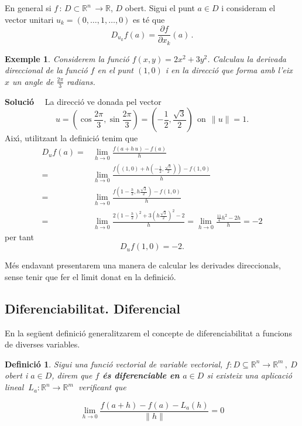 \documentclass[12pt]{article}
\newcommand{\solucio}{\textbf{Soluci{\'o}}\ \ }
\newtheorem{definicio}{Definici{\'o}}[subsection]
\newtheorem{exemple}{Exemple}[subsection]
\newcommand{\R}{\mathbb{R}}
\begin{document}
En general si $f\, :\, D\subset\R^n\, \longrightarrow\R$, $D$ obert. Sigui
el punt $a\in D$ i consideram el vector unitari $u_k =
(0,\ldots,  1,\ldots ,0)$ es t{\'e} que
\[
D_{u_k}f(a)=\frac{\partial f}{\partial
x_k}(a)\,.
\]


\vspace{0.4cm}
\begin{exemple}\label{exempderdir}
Considerem la funci{\'o} $f(x,y)=2x^2+3y^2$. Calculau la derivada direccional de la funci{\'o} $f$ en el punt $(1,0)$ i en la direcci{\'o} que forma amb l'eix $x$ un angle de $\frac{2\pi}{3}$ radians.
\end{exemple}

\solucio
La direcci{\'o} ve donada pel vector
\[
u=\left(\cos \frac{2\pi}{3},\sin \frac{2\pi}{3}\right )=\left(-\frac{1}{2},\frac{\sqrt{3}}{2}\right)\,\;
\mbox{on}\ \ \| u\| =1.
\]
Aix{\'\i}, utilitzant la definici{\'o} tenim que
\vspace{0.4cm}\begin{align*}
  D_uf(a) = & \lim_{h\to 0}\frac{f(a+h\, u)-f(a)}{h}  \\
   = & \lim_{h\to 0}\frac{f((1,0) +h
   (-\frac{1}{2},\frac{\sqrt{3}}{2}))-f(1,0)}{h}\\
   = &  \lim_{h\to 0} \frac{f(1-\frac{h}{2},h
   \frac{\sqrt{3}}{2})-f(1,0)}{h} \\
   = &  \lim_{h\to 0} \frac{2 (1-\frac{h}{2} )^2 + 3 (h \frac{\sqrt{3}}{2} )^2 -2 }{h}
  =  \lim_{h\to 0} \frac{\frac{11}{4}h^2 - 2h}{h}=-2
\end{align*}
per tant
\[
D_uf(1,0)=-2.
\]

\vspace{0.3cm}
M{\'e}s endavant presentarem una manera de calcular les derivades direccionals,
sense tenir que fer el l{\'\i}mit donat en la definici{\'o}.

\subsection{Diferenciabilitat. Diferencial}

En la seg{\"u}ent definici{\'o} generalitzarem el concepte de diferenciabilitat a
funcions de diverses variables.

\vspace{0.4cm}
\begin{definicio}
Sigui una funci{\'o} vectorial de variable vectorial,
$f:D \subseteq \R^{n} \longrightarrow \R^m\,,\ D$
obert i $a \in D $, direm que \textbf{$f$ {\'e}s diferenciable en
$a \in D $} si existeix una aplicaci{\'o} lineal $\ L_a: \R^{n}
\longrightarrow \R^m\ $ verificant que

\[
\lim_{h \to 0} \frac{f(a+h) - f(a) - L_a(h) }{\| h \|} = 0
\]
\end{definicio}
\end{document}
